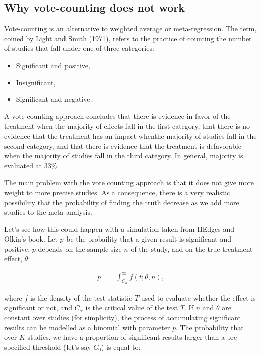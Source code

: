 \documentclass[]{book}
\providecommand{\tightlist}{%
  \setlength{\itemsep}{0pt}\setlength{\parskip}{0pt}}
\theoremstyle{definition}
\theoremstyle{definition}
\theoremstyle{definition}
\theoremstyle{remark}
\begin{document}
\hypertarget{why-vote-counting-does-not-work}{%
\subsection{Why vote-counting does not work}\label{why-vote-counting-does-not-work}}

Vote-counting is an alternative to weighted average or meta-regression.
The term, coined by Light and Smith (1971), refers to the practice of counting the number of studies that fall under one of three categories:

\begin{itemize}
\tightlist
\item
  Significant and positive,
\item
  Insignificant,
\item
  Significant and negative.
\end{itemize}

A vote-counting approach concludes that there is evidence in favor of the treatment when the majority of effects fall in the first category, that there is no evidence that the treatment has an impact whenthe majority of studies fall in the second category, and that there is evidence that the treatment is defavorable when the majority of studies fall in the third category.
In general, majority is evaluated at 33\%.

The main problem with the vote counting approach is that it does not give more weight to more precise studies.
As a consequence, there is a very realistic possibility that the probability of finding the truth decrease as we add more studies to the meta-analysis.

Let's see how this could happen with a simulation taken from HEdges and Olkin's book.
Let \(p\) be the probaility that a given result is significant and positive.
\(p\) depends on the sample size \(n\) of the study, and on the true treatment effect, \(\theta\):

\begin{align*}
  p & = \int_{C_{\alpha}}^{\infty}f(t;\theta,n),
\end{align*}

where \(f\) is the density of the test statistic \(T\) used to evaluate whether the effect is significant or not, and \(C_{\alpha}\) is the critical value of the test \(T\).
If \(n\) and \(\theta\) are constant over studies (for simplicity), the process of accumulating significant results can be modelled as a binomial with parameter \(p\).
The probability that over \(K\) studies, we have a proportion of significant results larger than a pre-specified threshold (let's say \(C_0\)) is equal to:
\end{document}
